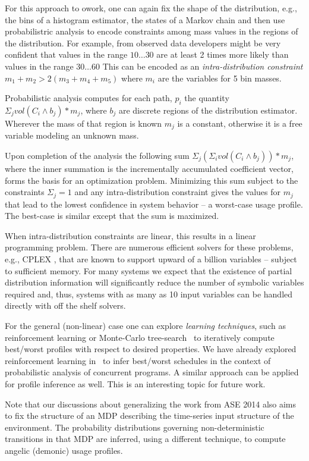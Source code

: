 For this approach to owork, one can again fix the shape of the
distribution, e.g., the bins of a histogram estimator, the states of a
Markov chain and then use probabilistric analysis to encode
constraints among mass values in the regions of the distribution.  
For example, from observed data developers might be
very confident that values in the range $10 \ldots 30$ are at least 2
times more likely than values in the range $30 \ldots 60$ This can be
encoded as an \textit{intra-distribution constraint} $m_1 + m_2 >
2(m_3 + m_4 + m_5)$ where $m_i$ are the variables for 5 bin masses.

Probabilistic analysis computes for each path, $p_i$
the quantity $\Sigma_{j} vol(C_i \wedge b_j)*m_j$, where $b_j$ are discrete
regions of the distribution estimator.  Wherever the mass
of that region is known $m_j$ is a constant, otherwise it is
a free variable modeling an unknown mass.


Upon completion of the analysis the following sum
$\Sigma_{j} (\Sigma_i vol(C_i \wedge b_j)) *m_j$, where
the inner summation 
is the incrementally accumulated coefficient vector,
forms the basis for an optimization problem.
Minimizing this sum subject to the constraints  
$\Sigma_j = 1$ and any intra-distribution constraint gives
the values for $m_j$ that lead to the lowest confidence in
system behavior -- a worst-case usage profile.  The best-case
is similar except that the sum is maximized.

When intra-distribution constraints are linear, this results
in a linear programming problem.  There are numerous efficient solvers
for these problems, e.g., CPLEX \cite{cplex2009v12}, that are known to
support upward of a billion variables -- subject to sufficient memory.
For many systems we expect that the existence of partial distribution
information
will significantly reduce the number of symbolic variables required
and, thus, systems with as many as 10 input variables can be handled
directly with off the shelf solvers. 

For the general (non-linear) case one can explore {\em learning
  techniques}, such as reinforcement learning or Monte-Carlo
tree-search~\cite{sutton1998reinforcement} to iteratively compute
best/worst profiles with respect to desired properties. We have
already explored reinforcement learning in~\cite{luckow2014probabilistic} to
infer best/worst schedules in the context of probabilistic analysis of
concurrent programs. A similar approach can be applied for profile
inference as well. This is an interesting topic for future work.


Note that our discussions about generalizing the work from ASE 2014 
also aims to fix the structure of an MDP describing the time-series
input structure of the environment.  The probability distributions
governing non-deterministic transitions in that MDP are inferred,
using a different technique, to compute angelic (demonic) usage
profiles.

